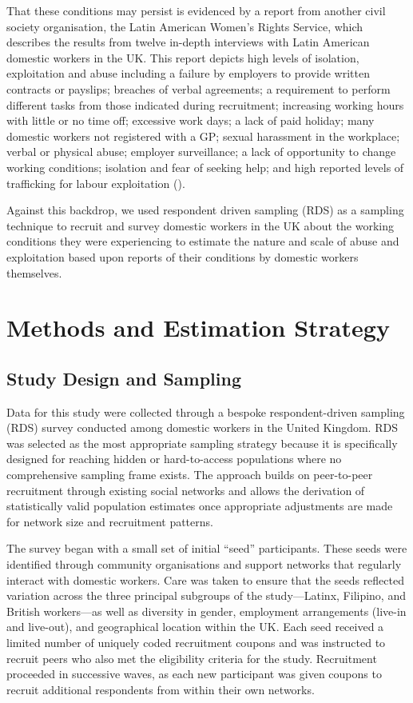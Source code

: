 \documentclass[
  12pt,
  letterpaper,
  DIV=11,
  numbers=noendperiod]{scrartcl}
\theoremstyle{plain}
\theoremstyle{definition}
\begin{document}
That these conditions may persist is evidenced by a report from another
civil society organisation, the Latin American Women's Rights Service,
which describes the results from twelve in-depth interviews with Latin
American domestic workers in the UK. This report depicts high levels of
isolation, exploitation and abuse including a failure by employers to
provide written contracts or payslips; breaches of verbal agreements; a
requirement to perform different tasks from those indicated during
recruitment; increasing working hours with little or no time off;
excessive work days; a lack of paid holiday; many domestic workers not
registered with a GP; sexual harassment in the workplace; verbal or
physical abuse; employer surveillance; a lack of opportunity to change
working conditions; isolation and fear of seeking help; and high
reported levels of trafficking for labour exploitation
(\textcite{latin_american_womens_rights_service_behind_2023}).

Against this backdrop, we used respondent driven sampling (RDS) as a
sampling technique to recruit and survey domestic workers in the UK
about the working conditions they were experiencing to estimate the
nature and scale of abuse and exploitation based upon reports of their
conditions by domestic workers themselves.

\section{Methods and Estimation
Strategy}\label{methods-and-estimation-strategy}

\subsection{Study Design and Sampling}\label{study-design-and-sampling}

Data for this study were collected through a bespoke respondent-driven
sampling (RDS) survey conducted among domestic workers in the United
Kingdom. RDS was selected as the most appropriate sampling strategy
because it is specifically designed for reaching hidden or
hard-to-access populations where no comprehensive sampling frame exists.
The approach builds on peer-to-peer recruitment through existing social
networks and allows the derivation of statistically valid population
estimates once appropriate adjustments are made for network size and
recruitment patterns.

The survey began with a small set of initial ``seed'' participants.
These seeds were identified through community organisations and support
networks that regularly interact with domestic workers. Care was taken
to ensure that the seeds reflected variation across the three principal
subgroups of the study---Latinx, Filipino, and British workers---as well
as diversity in gender, employment arrangements (live-in and live-out),
and geographical location within the UK. Each seed received a limited
number of uniquely coded recruitment coupons and was instructed to
recruit peers who also met the eligibility criteria for the study.
Recruitment proceeded in successive waves, as each new participant was
given coupons to recruit additional respondents from within their own
networks.
\end{document}
